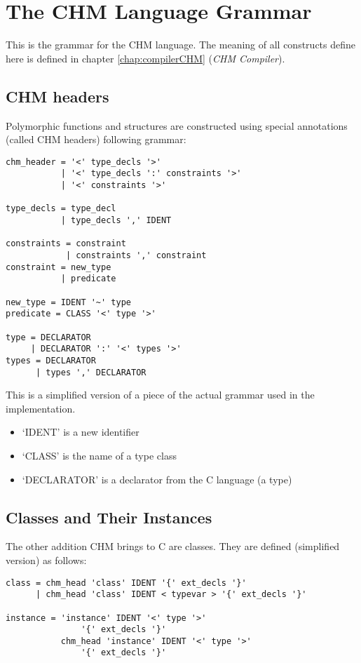 \chapter{The CHM Language Grammar}

This is the grammar for the CHM language. The meaning of all constructs define here is defined in chapter \ref{chap:compilerCHM} (\emph{CHM Compiler}).

\section{CHM headers}

Polymorphic functions and structures are constructed using special annotations (called CHM headers) following grammar:

\begin{lstlisting}
chm_header = '<' type_decls '>'
           | '<' type_decls ':' constraints '>'
           | '<' constraints '>'

type_decls = type_decl
           | type_decls ',' IDENT

constraints = constraint
            | constraints ',' constraint
constraint = new_type
           | predicate

new_type = IDENT '~' type
predicate = CLASS '<' type '>'

type = DECLARATOR
     | DECLARATOR ':' '<' types '>'
types = DECLARATOR
      | types ',' DECLARATOR
\end{lstlisting}

This is a simplified version of a piece of the actual grammar used in the implementation.

\begin{itemize}
    \item `IDENT' is a new identifier
    \item `CLASS' is the name of a type class
    \item `DECLARATOR' is a declarator from the C language (a type)
\end{itemize}

\section{Classes and Their Instances}

The other addition CHM brings to C are classes. They are defined (simplified version) as follows:

\begin{lstlisting}
class = chm_head 'class' IDENT '{' ext_decls '}'
      | chm_head 'class' IDENT < typevar > '{' ext_decls '}'

instance = 'instance' IDENT '<' type '>'
               '{' ext_decls '}'
           chm_head 'instance' IDENT '<' type '>'
               '{' ext_decls '}'
\end{lstlisting}

